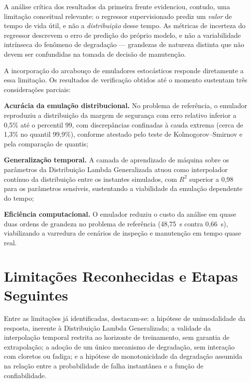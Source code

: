 A análise crítica dos resultados da primeira frente evidenciou, contudo, uma limitação conceitual relevante: o regressor supervisionado prediz um \textit{valor} de tempo de vida útil, e não a \textit{distribuição} desse tempo. As métricas de incerteza do regressor descrevem o erro de predição do próprio modelo, e não a variabilidade intrínseca do fenômeno de degradação --- grandezas de natureza distinta que não devem ser confundidas na tomada de decisão de manutenção.

A incorporação do arcabouço de emuladores estocásticos responde diretamente a essa limitação. Os resultados de verificação obtidos até o momento sustentam três considerações parciais:

\begin{alineas}
    \item \textbf{Acurácia da emulação distribucional.} No problema de referência, o emulador reproduziu a distribuição da margem de segurança com erro relativo inferior a 0,5\% até o percentil 99, com discrepâncias confinadas à cauda extrema (cerca de 1,3\% no quantil 99,9\%), conforme atestado pelo teste de Kolmogorov--Smirnov e pela comparação de quantis;
    \item \textbf{Generalização temporal.} A camada de aprendizado de máquina sobre os parâmetros da Distribuição Lambda Generalizada atuou como interpolador contínuo da distribuição entre os instantes simulados, com $R^2$ superior a 0,98 para os parâmetros sensíveis, sustentando a viabilidade da emulação dependente do tempo;
    \item \textbf{Eficiência computacional.} O emulador reduziu o custo da análise em quase duas ordens de grandeza no problema de referência (48,75~s contra 0,66~s), viabilizando a varredura de cenários de inspeção e manutenção em tempo quase real.
\end{alineas}

\section{Limitações Reconhecidas e Etapas Seguintes}

Entre as limitações já identificadas, destacam-se: a hipótese de unimodalidade da resposta, inerente à Distribuição Lambda Generalizada; a validade da interpolação temporal restrita ao horizonte de treinamento, sem garantia de extrapolação; a adoção de um único mecanismo de degradação, sem interação com cloretos ou fadiga; e a hipótese de monotonicidade da degradação assumida na relação entre a probabilidade de falha instantânea e a função de confiabilidade.

